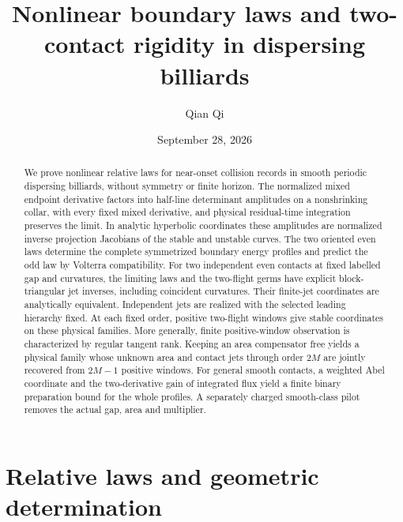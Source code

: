 
\title[Nonlinear boundary laws and two-contact rigidity]{Nonlinear boundary laws and two-contact rigidity
in dispersing billiards}
\author{Qian Qi}
\date{September 28, 2026}

\begin{abstract}
We prove nonlinear relative laws for near-onset collision records in
smooth periodic dispersing billiards, without symmetry or finite horizon.
The normalized mixed endpoint derivative factors into half-line determinant
amplitudes on a nonshrinking collar, with every fixed mixed derivative,
and physical residual-time integration preserves the limit. In analytic
hyperbolic coordinates these amplitudes are normalized inverse projection
Jacobians of the stable and unstable curves. The two oriented even laws
determine the complete symmetrized boundary energy profiles and predict
the odd law by Volterra compatibility. For two independent even contacts
at fixed labelled gap and curvatures, the limiting laws and the two-flight
germs have explicit block-triangular jet inverses, including coincident
curvatures. Their finite-jet coordinates are analytically equivalent.
Independent jets are realized with the selected leading hierarchy fixed.
At each fixed order, positive two-flight windows give stable coordinates
on these physical families. More generally, finite positive-window
observation is characterized by regular tangent rank. Keeping an area
compensator free yields a physical family whose unknown area and contact
jets through order $2M$ are jointly recovered from $2M-1$ positive
windows. For general smooth contacts, a weighted Abel coordinate and
the two-derivative gain of integrated flux yield a finite binary
preparation bound for the whole profiles. A separately charged
smooth-class pilot removes the actual gap, area and multiplier.
\end{abstract}
\maketitle


\part{Relative laws and geometric determination}













